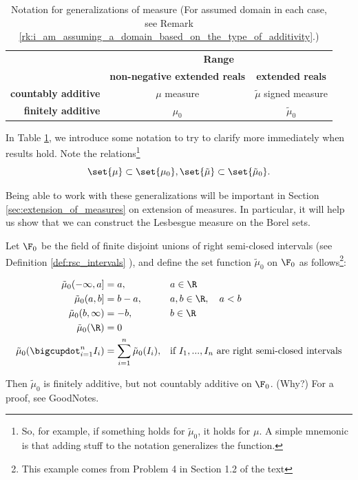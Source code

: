 \documentclass{article} %
\newcommand{\fasf}{\tilde{\mu}_0}
\begin{document}
\begin{table}[!h]
\centering	
\begin{tabular}{rcc}
&\multicolumn{2}{c}{\textbf{Range}} \\
& \textbf{non-negative extended reals} & \textbf{extended reals} \\
\textbf{countably additive}& $\mu$ measure  & $\tilde{\mu}$ signed measure \\
\textbf{finitely additive}& $\mu_0$ & $\tilde{\mu}_0$ \\	
\end{tabular}
\caption{Notation for generalizations of measure (For assumed domain in each case, see Remark \ref{rk:i_am_assuming_a_domain_based_on_the_type_of_additivity}.)}
\label{tab:notation_for_generalizations_of_measure}
\end{table}

In Table \ref{tab:notation_for_generalizations_of_measure},  we introduce some notation to try to clarify more immediately when results hold. Note the relations\footnote{So, for example, if something holds for $\tilde{\mu}_0$, it holds for $\mu$.  A simple mnemonic is that adding stuff to the notation generalizes the function.}  
\[ \set{\mu} \subset \set{\mu_0}, \set{\tilde{\mu}} \subset \set{\tilde{\mu}_0}. \]

\begin{remark}
Being able to work with these generalizations will be important in Section \ref{sec:extension_of_measures} on extension of measures.  In particular, it will help us show that we can construct the Lesbesgue measure on the Borel sets.
\end{remark}

 \begin{example} Let $\F_0$ be the field of finite disjoint unions of right semi-closed intervals (see Definition \ref{def:rsc_intervals} ), and define the set function $\fasf$ on $\F_0$ as follows\footnote{This example comes from Problem 4 in Section 1.2 of the text}:

\begin{align*}
\fasf(-\infty,a] &=a, && a \in \R  \\
\fasf(a,b] &= b-a, && a,b \in \R, \quad a<b  \\
\fasf(b, \infty) &= -b, && b \in \R \\
\fasf(\R) &=0 &&\\
\fasf(\bigcupdot_{i=1}^n I_i) &= \sum_{i=1}^n \fasf(I_i), && \text{if $I_1, ..., I_n$ are right semi-closed intervals} 
\end{align*}
	
Then $\fasf$ is finitely additive, but not countably additive on $\F_0$.  (Why?) For a proof, see GoodNotes.
 \end{example}
\end{document}
